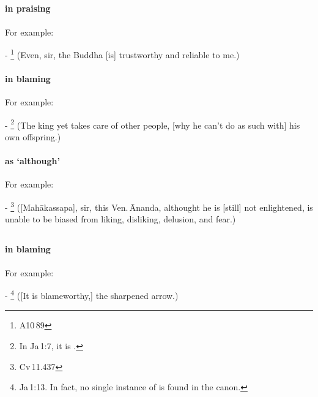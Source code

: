 \subsection*{}\label{nip:kiyncaapi}
\paragraph*{ in praising} For example:\par
- \footnote{A10\,89} (Even, sir, the Buddha [is] trustworthy and reliable to me.) \par
\paragraph*{ in blaming} For example:\par
- \footnote{In Ja\,1:7, it is .} (The king yet takes care of other people, [why he can't do as such with] his own offspring.) \par
\paragraph*{ as `although'} For example:\par
- \footnote{Cv\,11.437} ([Mah\=akassapa], sir, this Ven.\,\=Ananda, althought he is [still] not enlightened, is unable to be biased from liking, disliking, delusion, and fear.) \par

\subsection*{}\label{nip:dhiiratthu}
\paragraph*{ in blaming} For example:\par
- \footnote{Ja\,1:13. In fact, no single instance of  is found in the canon.} ([It is blameworthy,] the sharpened arrow.) \par

